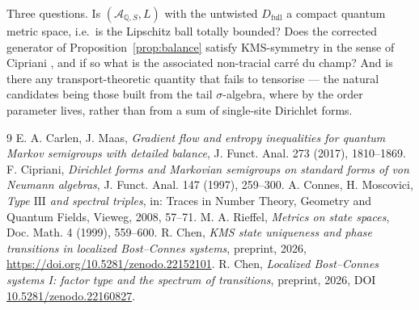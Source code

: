 \documentclass[11pt]{amsart}
\numberwithin{equation}{section}
\theoremstyle{definition}
\theoremstyle{remark}
\newcommand{\Q}{\mathbb{Q}}
\newcommand{\cA}{\mathcal{A}}
\newcommand{\Df}{D_{\mathrm{full}}}
\begin{document}
Three questions. Is $(\cA_{\Q,S},L)$ with the untwisted $\Df$ a compact quantum metric
space, i.e.\ is the Lipschitz ball totally bounded? Does the corrected generator of
Proposition~\ref{prop:balance} satisfy KMS-symmetry in the sense of Cipriani
\cite{Cipriani}, and if so what
is the associated non-tracial carré du champ? And is there any transport-theoretic quantity
that fails to tensorise --- the natural candidates being those built from the tail
$\sigma$-algebra, where by \cite[Prop.~7.2]{SeriesI} the order parameter lives, rather than
from a sum of single-site Dirichlet forms.

\begin{thebibliography}{9}
 E. A. Carlen, J. Maas, \emph{Gradient flow and entropy inequalities for quantum Markov semigroups with detailed balance}, J. Funct. Anal. 273 (2017), 1810--1869.
 F. Cipriani, \emph{Dirichlet forms and Markovian semigroups on standard forms of von Neumann algebras}, J. Funct. Anal. 147 (1997), 259--300.
 A. Connes, H. Moscovici, \emph{Type $\mathrm{III}$ and spectral triples}, in: Traces in Number Theory, Geometry and Quantum Fields, Vieweg, 2008, 57--71.
 M. A. Rieffel, \emph{Metrics on state spaces}, Doc. Math. 4 (1999), 559--600.
 R. Chen, \emph{KMS state uniqueness and phase transitions in localized Bost--Connes systems}, preprint, 2026, \newline\url{https://doi.org/10.5281/zenodo.22152101}.
 R. Chen, \emph{Localized Bost--Connes systems I: factor type and the spectrum of transitions}, preprint, 2026, DOI \href{https://doi.org/10.5281/zenodo.22160827}{10.5281/zenodo.22160827}.
\end{thebibliography}
\end{document}
